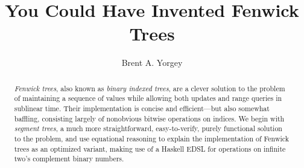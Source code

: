 \documentclass{jfp}
\theoremstyle{definition}
\theoremstyle{remark}
\begin{document}


\title{You Could Have Invented Fenwick Trees}
\begin{authgrp}
  \author{Brent A. Yorgey}
\end{authgrp}

\begin{abstract}
  \emph{Fenwick trees}, also known as \emph{binary indexed trees}, are a
  clever solution to the problem of maintaining a sequence of values
  while allowing both updates and range queries in sublinear time.
  Their implementation is concise and efficient---but also somewhat
  baffling, consisting largely of nonobvious bitwise operations on
  indices.  We begin with \emph{segment trees}, a much more
  straightforward, easy-to-verify, purely functional solution to the
  problem, and use equational reasoning to explain the implementation
  of Fenwick trees as an optimized variant, making use of a Haskell
  EDSL for operations on infinite two's complement binary numbers.
\end{abstract}





\end{document}
